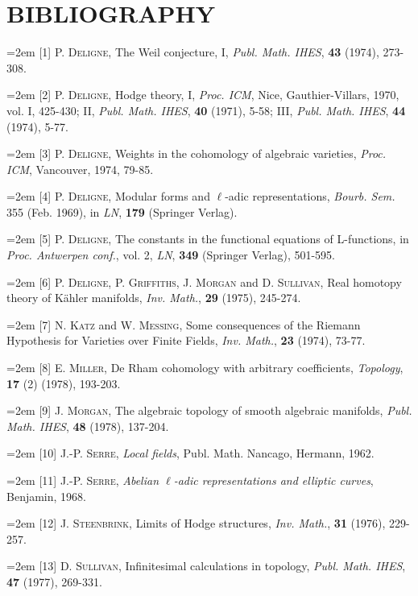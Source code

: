 \documentclass[11pt,leqno]{article}
\begin{document}
\section*{BIBLIOGRAPHY}

{\small
\noindent\hangindent=2em
[1] P. \textsc{Deligne}, The Weil conjecture, I, \textit{Publ. Math. IHES}, \textbf{43} (1974), 273-308.

\noindent\hangindent=2em
[2] P. \textsc{Deligne}, Hodge theory, I, \textit{Proc. ICM}, Nice, Gauthier-Villars, 1970, vol. I, 425-430; II, \textit{Publ. Math. IHES}, \textbf{40} (1971), 5-58; III, \textit{Publ. Math. IHES}, \textbf{44} (1974), 5-77.

\noindent\hangindent=2em
[3] P. \textsc{Deligne}, Weights in the cohomology of algebraic varieties, \textit{Proc. ICM}, Vancouver, 1974, 79-85.

\noindent\hangindent=2em
[4] P. \textsc{Deligne}, Modular forms and \(\ell\)-adic representations, \textit{Bourb. Sem.} 355 (Feb. 1969), in \textit{LN}, \textbf{179} (Springer Verlag).

\noindent\hangindent=2em
[5] P. \textsc{Deligne}, The constants in the functional equations of L-functions, in \textit{Proc. Antwerpen conf.}, vol. 2, \textit{LN}, \textbf{349} (Springer Verlag), 501-595.

\noindent\hangindent=2em
[6] P. \textsc{Deligne}, P. \textsc{Griffiths}, J. \textsc{Morgan} and D. \textsc{Sullivan}, Real homotopy theory of Kähler manifolds, \textit{Inv. Math.}, \textbf{29} (1975), 245-274.

\noindent\hangindent=2em
[7] N. \textsc{Katz} and W. \textsc{Messing}, Some consequences of the Riemann Hypothesis for Varieties over Finite Fields, \textit{Inv. Math.}, \textbf{23} (1974), 73-77.

\noindent\hangindent=2em
[8] E. \textsc{Miller}, De Rham cohomology with arbitrary coefficients, \textit{Topology}, \textbf{17} (2) (1978), 193-203.

\noindent\hangindent=2em
[9] J. \textsc{Morgan}, The algebraic topology of smooth algebraic manifolds, \textit{Publ. Math. IHES}, \textbf{48} (1978), 137-204.

\noindent\hangindent=2em
[10] J.-P. \textsc{Serre}, \textit{Local fields}, Publ. Math. Nancago, Hermann, 1962.

\noindent\hangindent=2em
[11] J.-P. \textsc{Serre}, \textit{Abelian \(\ell\)-adic representations and elliptic curves}, Benjamin, 1968.

\noindent\hangindent=2em
[12] J. \textsc{Steenbrink}, Limits of Hodge structures, \textit{Inv. Math.}, \textbf{31} (1976), 229-257.

\noindent\hangindent=2em
[13] D. \textsc{Sullivan}, Infinitesimal calculations in topology, \textit{Publ. Math. IHES}, \textbf{47} (1977), 269-331.
\par}
\end{document}
